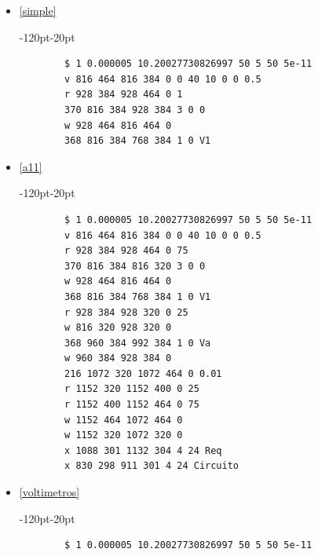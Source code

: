\documentclass{article}
\begin{document}
\begin{itemize}
	\item \href{https://www.falstad.com/circuit/circuitjs.html?ctz=CQAgjCAMB0l3BWcMBMcUHYMGZIA4UA2ATmIxAUgoqoQFMBaMMAKADcQ8xCQAWQ3p24hseQVSq8qYCVCjQELAE4hiKPCLGr1fAXNbYMVLj1GC1GsyLmQWAd20b+gk7vEtshDa6sYvmwQgqADVWIA}{\ref{simple}}  \\
	\begin{adjustwidth}{-120pt}{-20pt}
		\begin{lstlisting}
		$ 1 0.000005 10.20027730826997 50 5 50 5e-11
		v 816 464 816 384 0 0 40 10 0 0 0.5
		r 928 384 928 464 0 1
		370 816 384 928 384 3 0 0
		w 928 464 816 464 0
		368 816 384 768 384 1 0 V1
	\end{lstlisting}
	\end{adjustwidth}
	\item \href{https://www.falstad.com/circuit/circuitjs.html?ctz=CQAgjCAMB0l3BWcMBMcUHYMGZIA4UA2ATmIxAUgoqoQFMBaMMAKADcQ8xCQAWQ3p24hseQVSq8qYCVCjQELAE4hiKPCLGr1fAXIyLsGKlx6jBpkWhFzILAO7aN-C8JdQW2QhsvmQGb01BCCoANVYVNQ0-KKtZFEVHX2tY7Gs7Lw1iQioYtSDwOVCAQwdVHILUrTsUYRkMFDjkBt1xeUgI8DAERrTpbsapeMUVZh6+OC7x9yoDMrHBvXrF8XmBpuWmuwAPZDxojq60kUhBQRRBACU6AEcWXbxcEBRiLOYTiHPBAGEASyUAMYAV1+ABcAPYsIA}{\ref{a11}}  \\
\begin{adjustwidth}{-120pt}{-20pt}
	\begin{lstlisting}
		$ 1 0.000005 10.20027730826997 50 5 50 5e-11
		v 816 464 816 384 0 0 40 10 0 0 0.5
		r 928 384 928 464 0 75
		370 816 384 816 320 3 0 0
		w 928 464 816 464 0
		368 816 384 768 384 1 0 V1
		r 928 384 928 320 0 25
		w 816 320 928 320 0
		368 960 384 992 384 1 0 Va
		w 960 384 928 384 0
		216 1072 320 1072 464 0 0.01
		r 1152 320 1152 400 0 25
		r 1152 400 1152 464 0 75
		w 1152 464 1072 464 0
		w 1152 320 1072 320 0
		x 1088 301 1132 304 4 24 Req
		x 830 298 911 301 4 24 Circuito
	\end{lstlisting}
\end{adjustwidth}
	\item \href{https://www.falstad.com/circuit/circuitjs.html?ctz=CQAgjCAMB0l3BWcMBMcUHYMGZIA4UA2ATmIxAUgoqoQFMBaMMAKADcQ8xCQAWQ3p24hseQVSq8qYOFDkwELAE4hiKPCLGr1fAXIyLsGKlx6jBpkWhHyWAd20b+F4c6gtshDZfMgMXzUEIKgA1VhU1DV9IqwkQFEUHH2sY7GtIFgAHVX9YnLMtbHlkeHgs-MCKtyK4mVK4ewq0qlT0xrICwVStDIcO3S6dNwygA}{\ref{voltimetros}}  \\
\begin{adjustwidth}{-120pt}{-20pt}
	\begin{lstlisting}
		$ 1 0.000005 10.20027730826997 50 5 50 5e-11

\end{lstlisting}
\end{adjustwidth}
\end{itemize}
\end{document}
